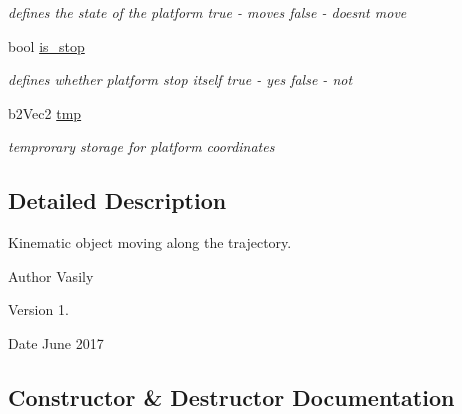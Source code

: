 \begin{DoxyCompactItemize}
\begin{DoxyCompactList}\small\item\em defines the state of the platform \textquotesingle{}true\textquotesingle{} -\/ moves \textquotesingle{}false\textquotesingle{} -\/ doesn\textquotesingle{}t move \end{DoxyCompactList}\item 
\mbox{\label{class_platform_ae26e486a480978c747779d580aa27918}} 
bool \hyperlink{class_platform_ae26e486a480978c747779d580aa27918}{is\+\_\+stop}
\begin{DoxyCompactList}\small\item\em defines whether platform stop itself \textquotesingle{}true\textquotesingle{} -\/ yes \textquotesingle{}false\textquotesingle{} -\/ not \end{DoxyCompactList}\item 
\mbox{\label{class_platform_a2f120cbb66ac4972fdd05ba816484dc0}} 
b2\+Vec2 \hyperlink{class_platform_a2f120cbb66ac4972fdd05ba816484dc0}{tmp}
\begin{DoxyCompactList}\small\item\em temprorary storage for platform coordinates \end{DoxyCompactList}\end{DoxyCompactItemize}


\subsection{Detailed Description}
Kinematic object moving along the trajectory. 

\begin{DoxyAuthor}{Author}
Vasily 
\end{DoxyAuthor}
\begin{DoxyVersion}{Version}
1. 
\end{DoxyVersion}
\begin{DoxyDate}{Date}
June 2017 
\end{DoxyDate}


\subsection{Constructor \& Destructor Documentation}
\mbox{\label{class_platform_a7c8e5045e5df1165c1154605e1a05339}} 
